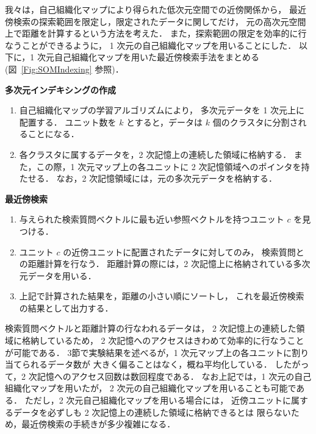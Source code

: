 我々は，自己組織化マップにより得られた低次元空間での近傍関係から，
最近傍検索の探索範囲を限定し，限定されたデータに関してだけ，
元の高次元空間上で距離を計算するという方法を考えた．
また，探索範囲の限定を効率的に行なうことができるように，
1 次元の自己組織化マップを用いることにした．
以下に，1 次元自己組織化マップを用いた最近傍検索手法をまとめる(図~\ref{Fig:SOMIndexing} 参照)．

\vspace*{2mm}
\noindent
{\bf 多次元インデキシングの作成}

\begin{enumerate}
\item	自己組織化マップの学習アルゴリズムにより，
多次元データを 1 次元上に配置する．
ユニット数を $k$ とすると，データは $k$ 個のクラスタに分割されることになる．

\item	各クラスタに属するデータを，2 次記憶上の連続した領域に格納する．
また，この際，1 次元マップ上の各ユニットに 2 次記憶領域へのポインタを持たせる．
なお，2 次記憶領域には，元の多次元データを格納する．
\end{enumerate}

\noindent
{\bf 最近傍検索}

\begin{enumerate}
\item	与えられた検索質問ベクトルに最も近い参照ベクトルを持つユニット $c$ を見つける．

\item	ユニット $c$ の近傍ユニットに配置されたデータに対してのみ，
検索質問との距離計算を行なう．
距離計算の際には，2 次記憶上に格納されている多次元データを用いる．

\item	上記で計算された結果を，距離の小さい順にソートし，
これを最近傍検索の結果として出力する．
\end{enumerate}

\vspace*{2mm}

検索質問ベクトルと距離計算の行なわれるデータは，
2 次記憶上の連続した領域に格納しているため，
2 次記憶へのアクセスはきわめて効率的に行なうことが可能である．
3節で実験結果を述べるが，1 次元マップ上の各ユニットに割り当てられるデータ数が
大きく偏ることはなく，概ね平均化している．
したがって，2 次記憶へのアクセス回数は数回程度である．
なお上記では，1 次元の自己組織化マップを用いたが，
2 次元の自己組織化マップを用いることも可能である．
ただし，2 次元自己組織化マップを用いる場合には，
近傍ユニットに属するデータを必ずしも 2 次記憶上の連続した領域に格納できるとは
限らないため，最近傍検索の手続きが多少複雑になる．

